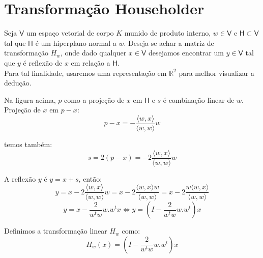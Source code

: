 \documentclass[10pt,a4paper]{article}
\begin{document}
\section{Transformação Householder}
\par
{}
Seja $\mathsf{V}$ um espaço vetorial de corpo $K$ munido de produto interno, $w \in \mathsf{V}$ e $\mathsf{H} \subset \mathsf{V}$ tal que $\mathsf{H}$ é um hiperplano normal a $w$. Deseja-se achar a matriz de transformação $H_w$, onde dado qualquer $x \in \mathsf{V}$ desejamos encontrar um $y \in \mathsf{V}$ tal que $y$ é reflexão de $x$ em relação a $\mathsf{H}$. \\

Para tal finalidade, usaremos uma representação em $\mathbb{R}^2$ para melhor visualizar a dedução.\\

\par
Na figura acima, $p$ como a projeção de $x$ em $\mathsf{H}$ e $s$ é combinação linear de $w$. \\

Projeção de $x$ em $p - x$:\\
\[
	p - x = -\frac{\langle w, x \rangle}{\langle w, w \rangle} w 
\]
\par
temos também:
\[
	s = 2 (p - x) = - 2 \frac{\langle w, x \rangle}{\langle w, w \rangle} w
\]
\par
A reflexão $y$ é $y = x + s$, então:
\[
	y = x - 2 \frac{\langle w, x \rangle}{\langle w, w \rangle} w 
	  = x - 2 \frac{\langle w, x \rangle w }{\langle w, w \rangle}
	  = x - 2 \frac{w \langle w, x \rangle }{\langle w, w \rangle}
\]
\[
	y = x - \frac{2}{w^t w} w.w^t x \Leftrightarrow  
	y = \left(I - \frac{2}{w^t w} w.w^t\right) x
\]
\par
Definimos a transformação linear $H_w$ como:
\[
	H_w(x) = \left(I - \frac{2}{w^t w} w.w^t\right) x
\]
\end{document}
